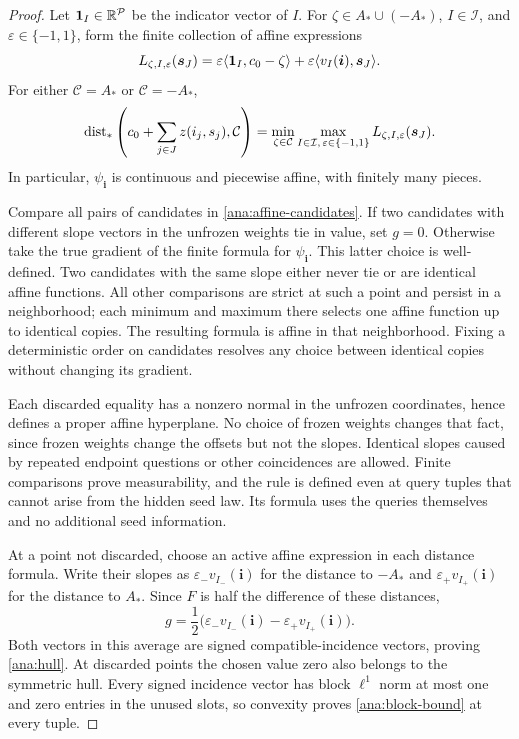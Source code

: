 \begin{proof}
Let \(\mathbf 1_I\in\mathbb R^{\mathcal P}\) be the indicator vector of
\(I\). For \(\zeta\in A_*\cup(-A_*)\),
\(I\in\mathcal I\), and \(\varepsilon\in\{-1,1\}\), form the
finite collection of affine expressions
\begin{equation}
 L_{\zeta,I,\varepsilon}(\boldsymbol s_J)
    =\varepsilon\langle\mathbf 1_I,c_0-\zeta\rangle
       +\varepsilon\langle v_I(\boldsymbol i),\boldsymbol s_J\rangle.
 \label{ana:affine-candidates}
\end{equation}
For either \(\mathcal C=A_*\) or \(\mathcal C=-A_*\),
\[
 \operatorname{dist}_*\left(c_0+\sum_{j\in J}z(i_j,s_j),\mathcal C\right)
   =\min_{\zeta\in\mathcal C}
       \max_{I\in\mathcal I,\,\varepsilon\in\{-1,1\}}
                    L_{\zeta,I,\varepsilon}(\boldsymbol s_J).
\]
In particular, \(\psi_{\boldsymbol i}\) is continuous and piecewise
affine, with finitely many pieces.

Compare all pairs of candidates in \eqref{ana:affine-candidates}.
If two candidates with different slope vectors in the unfrozen
weights tie in value, set \(g=0\). Otherwise take the true gradient
of the finite formula for \(\psi_{\boldsymbol i}\). This latter
choice is well-defined. Two candidates with the same slope either
never tie or are identical affine functions. All other comparisons
are strict at such a point and persist in a neighborhood; each
minimum and maximum there selects one affine function up to
identical copies. The resulting formula is affine in that
neighborhood. Fixing a deterministic order on candidates resolves
any choice between identical copies without changing its gradient.

Each discarded equality has a nonzero normal in the unfrozen
coordinates, hence defines a proper affine hyperplane. No choice of
frozen weights changes that fact, since frozen weights change the
offsets but not the slopes. Identical slopes caused by repeated
endpoint questions or other coincidences are allowed. Finite
comparisons prove measurability, and the rule is defined even at
query tuples that cannot arise from the hidden seed law. Its formula
uses the queries themselves and no additional seed information.

At a point not discarded, choose an active affine expression in
each distance formula. Write their slopes as
\(\varepsilon_-v_{I_-}(\boldsymbol i)\) for the distance to
\(-A_*\) and \(\varepsilon_+v_{I_+}(\boldsymbol i)\) for the
distance to \(A_*\). Since \(F\) is half the difference of
these distances,
\[
 g=\frac12\bigl(\varepsilon_-v_{I_-}(\boldsymbol i)
                  -\varepsilon_+v_{I_+}(\boldsymbol i)\bigr).
\]
Both vectors in this average are signed compatible-incidence
vectors, proving \eqref{ana:hull}. At discarded points the chosen
value zero also belongs to the symmetric hull. Every signed
incidence vector has block \(\ell^1\) norm at most one and zero
entries in the unused slots, so convexity proves
\eqref{ana:block-bound} at every tuple.
\end{proof}

